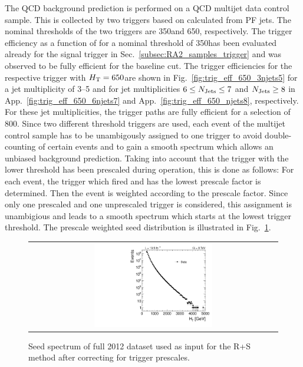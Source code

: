 The QCD background prediction is performed on a QCD multijet data control sample. This is collected by two triggers based on \HT calculated from PF jets. The nominal \HT thresholds of the two triggers are 350\gev and 650\gev, respectively. The trigger efficiency as a function of \HT for a nominal threshold of 350\gev has been evaluated already for the signal trigger in Sec.~\ref{subsec:RA2_samples_trigger} and was observed to be fully efficient for the baseline \HT cut. The trigger efficiencies for the respective trigger with $H_{\text{T}} = 650$\gev are shown in Fig.~\ref{fig:trig_eff_650_3njets5} for a jet multiplicity of 3--5 and for jet multiplicities $6 \leq N_{\text{Jets}} \leq 7$ and $N_{\text{Jets}} \geq 8$ in App.~\ref{fig:trig_eff_650_6njets7} and App.~\ref{fig:trig_eff_650_njets8}, respectively. For these jet multiplicities, the trigger paths are fully efficient for a \HT selection of 800\gev. Since two different \HT threshold triggers are used, each event of the multijet control sample has to be unambigously assigned to one trigger to avoid double-counting of certain events and to gain a smooth \HT spectrum which allows an unbiased background prediction. Taking into account that the trigger with the lower \HT threshold has been prescaled during operation, this is done as follows: For each event, the trigger which fired and has the lowest prescale factor is determined. Then the event is weighted according to the prescale factor. Since only one prescaled and one unprescaled trigger is considered, this assignment is unambigious and leads to a smooth \HT spectrum which starts at the lowest trigger threshold. The prescale weighted seed \HT distribution is illustrated in Fig.~\ref{fig:qcd_rs_seedht}.
\begin{figure}[!t]
  \centering
  \begin{tabular}{c}
                \includegraphics[width=0.49\textwidth]{figures/HT_data.pdf}
  \end{tabular}
  \caption{Seed \HT spectrum of full 2012 dataset used as input for the R+S method after correcting for trigger prescales.}
  \label{fig:qcd_rs_seedht}
\end{figure}
